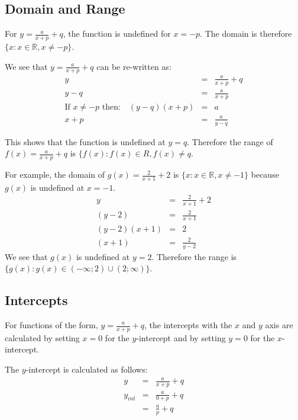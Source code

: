\subsection{Domain and Range}
For $y=\frac{a}{x+p} + q$, the function is undefined for $x=-p$. The domain is therefore $\{x:x\in\mathbb{R},x\ne -p\}$.

We see that $y=\frac{a}{x+p} + q$ can be re-written as:
\begin{eqnarray*}
y&=&\frac{a}{x+p} + q\\
y-q&=&\frac{a}{x+p}\\
\mbox{If $x\ne -p$ then:}\quad (y-q)(x+p)&=&a\\
x+p&=&\frac{a}{y-q}
\end{eqnarray*}

This shows that the function is undefined at $y=q$. Therefore the range of $f(x)=\frac{a}{x+p} + q$ is $\{f(x):f(x)\in R, f(x) \neq q$.

For example, the domain of $g(x)=\frac{2}{x+1} + 2$ is $\{x:x\in\mathbb{R}, x\ne-1\}$ because $g(x)$ is undefined at $x=-1$.
\begin{eqnarray*}
y&=&\frac{2}{x+1} + 2\\
(y-2)&=&\frac{2}{x+1}\\
(y-2)(x+1)&=& 2\\
(x+1)&=&\frac{2}{y-2}
\end{eqnarray*}
We see that $g(x)$ is undefined at $y=2$. Therefore the range is $\{g(x):g(x)\in(-\infty;2)\cup(2;\infty)\}$.


\subsection{Intercepts}
For functions of the form, $y=\frac{a}{x+p} + q$, the intercepts with the $x$ and $y$ axis are calculated by setting $x=0$ for the $y$-intercept and by setting $y=0$ for the $x$-intercept.

The $y$-intercept is calculated as follows:
\begin{eqnarray}
y&=&\frac{a}{x+p} + q\\
y_{int}&=&\frac{a}{0+p} + q\\
&=&\frac{a}{p} + q
\end{eqnarray}

